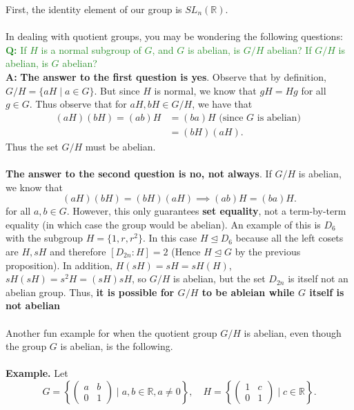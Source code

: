 \documentclass[12pt,letterpaper]{algebra_book}
\newcommand{\normal}{\unlhd}
\theoremstyle{definition}
\begin{document}
    First, the identity element of our group is $SL_n(\mathbb{R})$.
    \\
    \\
    \indent In dealing with quotient groups, you may be wondering the
    following questions:\\
    \textcolor{ForestGreen}{\textbf{Q:} If $H$ is a normal subgroup of
    $G$, and $G$ is abelian, is $G/H$ abelian? If $G/H$ is abelian, is
    $G$ abelian?}
    \\
    \textbf{A:} \textbf{The answer to the first question is yes}. 
    Observe that
        by definition, $G/H = \{aH \mid a \in G\}.$ But since $H$ 
        is normal, we know that $gH = Hg$ for all $g \in G$. 
        Thus observe that for $aH, bH \in G/H$, we have that 
        \begin{align*}
        (aH)(bH) =(ab)H &= (ba)H \text{ (since } G \text{ is abelian) }\\
        &= (bH)(aH).
        \end{align*}
        Thus the set $G/H$ must be abelian.
    \\
    \\
    \textbf{The answer to the second question is \textbf{no, not always}}. If $G/H$ is abelian, 
    we know that 
    $$
    (aH)(bH) = (bH)(aH) \implies (ab)H = (ba)H.
    $$ 
    for all $a, b \in G$. However, this only guarantees \textbf{set equality}, 
    not a term-by-term equality (in which case the group would be abelian). 
    An example of this is $D_{6}$ with the subgroup $H = \{1, r, r^2\}.$
    In this case $H \unlhd D_6$ because all the left cosets are $H, sH$ and therefore 
    $[D_{2n}: H] = 2$ (Hence $H \normal G$ by the previous proposition). In addition, 
    $H(sH) = sH=  sH(H)$, $sH(sH) = s^2H = (sH)sH$, so $G/H$ is abelian, but the set $D_{2n}$
    is itself not an abelian group. Thus, \textbf{it is possible for
    $G/H$ to be ableian while $G$ itself is not abelian }
    \\
    \\
    Another fun example for when the quotient group $G/H$ is abelian,
    even though the group $G$ is abelian, is the following.
    \\
    \\
    \textbf{Example.}
    Let 
    \[
        G = \left\{
        \begin{pmatrix}
            a & b \\
            0 & 1    
        \end{pmatrix} \mid a, b \in \mathbb{R}, a \ne 0\right\}, 
        \quad H = 
        \left\{
            \begin{pmatrix}
                1 & c \\
                0 & 1
            \end{pmatrix}
            \mid c \in \mathbb{R} 
        \right\}.   
    \]
\end{document}
